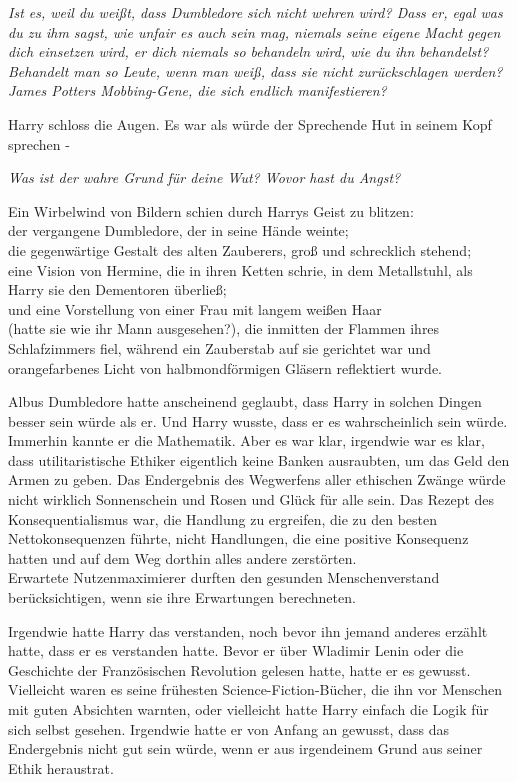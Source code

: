 {\emph{Ist es, weil du weißt, dass Dumbledore sich nicht wehren wird? Dass er, egal was du zu ihm sagst, wie unfair es auch sein mag, niemals seine eigene Macht gegen dich einsetzen wird, er dich niemals so behandeln wird, wie du ihn behandelst? Behandelt man so Leute, wenn man weiß, dass sie nicht zurückschlagen werden? James Potters Mobbing-Gene, die sich endlich manifestieren?}

Harry schloss die Augen. Es war als würde der Sprechende Hut in seinem Kopf sprechen -

\emph{Was ist der wahre Grund für deine Wut? Wovor hast du Angst?}

Ein Wirbelwind von Bildern schien durch Harrys Geist zu blitzen:\\ der vergangene Dumbledore, der in seine Hände weinte;\\ die gegenwärtige Gestalt des alten Zauberers, groß und schrecklich stehend;\\ eine Vision von Hermine, die in ihren Ketten schrie, in dem Metallstuhl, als Harry sie den Dementoren überließ;\\ und eine Vorstellung von einer Frau mit langem weißen Haar\\ (hatte sie wie ihr Mann ausgesehen?), die inmitten der Flammen ihres Schlafzimmers fiel, während ein Zauberstab auf sie gerichtet war und orangefarbenes Licht von halbmondförmigen Gläsern reflektiert wurde.

Albus Dumbledore hatte anscheinend geglaubt, dass Harry in solchen Dingen besser sein würde als er. Und Harry wusste, dass er es wahrscheinlich sein würde. Immerhin kannte er die Mathematik. Aber es war klar, irgendwie war es klar, dass utilitaristische Ethiker eigentlich keine Banken ausraubten, um das Geld den Armen zu geben. Das Endergebnis des Wegwerfens aller ethischen Zwänge würde nicht wirklich Sonnenschein und Rosen und Glück für alle sein. Das Rezept des Konsequentialismus war, die Handlung zu ergreifen, die zu den besten Nettokonsequenzen führte, nicht Handlungen, die eine positive Konsequenz hatten und auf dem Weg dorthin alles andere zerstörten.\\ Erwartete Nutzenmaximierer durften den gesunden Menschenverstand berücksichtigen, wenn sie ihre Erwartungen berechneten.

Irgendwie hatte Harry das verstanden, noch bevor ihn jemand anderes erzählt hatte, dass er es verstanden hatte. Bevor er über Wladimir Lenin oder die Geschichte der Französischen Revolution gelesen hatte, hatte er es gewusst. Vielleicht waren es seine frühesten Science-Fiction-Bücher, die ihn vor Menschen mit guten Absichten warnten, oder vielleicht hatte Harry einfach die Logik für sich selbst gesehen. Irgendwie hatte er von Anfang an gewusst, dass das Endergebnis nicht gut sein würde, wenn er aus irgendeinem Grund aus seiner Ethik heraustrat.

}
